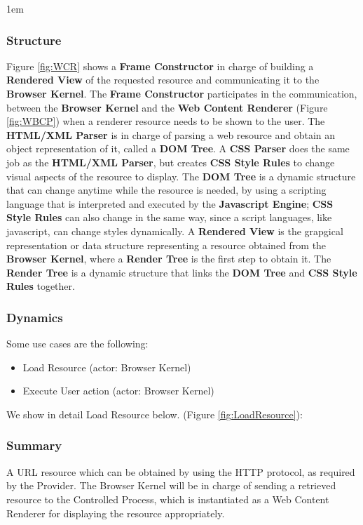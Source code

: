 \documentclass[prodmode,acmtecs]{acmsmall}
\begin{document}
  \begin{shaded}
    \leftskip1em

    \subsubsection*{Structure}
    Figure \ref{fig:WCR} shows a \textbf{Frame Constructor} in charge of building a \textbf{Rendered View} of the requested resource and communicating it to the \textbf{Browser Kernel}. The \textbf{Frame Constructor} participates in the communication, between the \textbf{Browser Kernel} and the \textbf{Web Content Renderer} (Figure \ref{fig:WBCP}) when a renderer resource needs to be shown to the user. The \textbf{HTML/XML Parser} is in charge of parsing a web resource and obtain an object representation of it, called a \textbf{DOM Tree}. A \textbf{CSS Parser} does the same job as the \textbf{HTML/XML Parser}, but creates \textbf{CSS Style Rules} to change visual aspects of the resource to display. The \textbf{DOM Tree} is a dynamic structure that can change anytime while the resource is needed, by using a scripting language that is interpreted and executed by the \textbf{Javascript Engine}; \textbf{CSS Style Rules} can also change in the same way, since a script languages, like javascript, can change styles dynamically. A \textbf{Rendered View} is the grapgical representation or data structure representing a resource obtained from the \textbf{Browser Kernel}, where a \textbf{Render Tree} is the first step to obtain it. The \textbf{Render Tree} is a dynamic structure that links the \textbf{DOM Tree} and \textbf{CSS Style Rules} together.

    \subsubsection*{Dynamics}
    Some use cases are the following:
    \begin{itemize}\leftskip2.5em
      \item Load Resource (actor: Browser Kernel)

      \item Execute User action (actor: Browser Kernel)

    \end{itemize}
    We show in detail Load Resource below. (Figure \ref{fig:LoadResource}):
    \subsubsection*{Summary} A URL resource which can be obtained by using the HTTP protocol, as required by the Provider. The Browser Kernel will be in charge of sending a retrieved resource to the Controlled Process, which is instantiated as a Web Content Renderer for displaying the resource appropriately.

\end{shaded}
\end{document}
